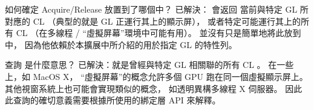 \startQUESTION
{}如何確定 Acquire/Release 放置到了哪個中？
\stopQUESTION
\startANSWER
已解決：  會返回
當前與特定 GL 所對應的 CL 
（典型的就是 GL 正運行其上的顯示屏），
或者特定可能運行其上的所有 CL 
（在多線程 / “虛擬屏幕”環境中可能有用）。
並沒有只是簡單地將此放到\insection[clShareGl]中，
因為他依賴於本擴展中所介紹的用於指定 GL 的特性列。
\stopANSWER

\startQUESTION
查詢  是什麼意思？
\stopQUESTION
\startANSWER
已解決：就是曾經與特定 GL 相關聯的所有 CL 。
在一些上，如 MacOS X，
“虛擬屏幕”的概念允許多個 GPU 跑在同一個虛擬顯示屏上。
其他視窗系統上也可能會實現類似的概念，
如透明異構多線程 X 伺服器。
因此此查詢的確切意義需要根據所使用的綁定層 API 來解釋。
\stopANSWER


